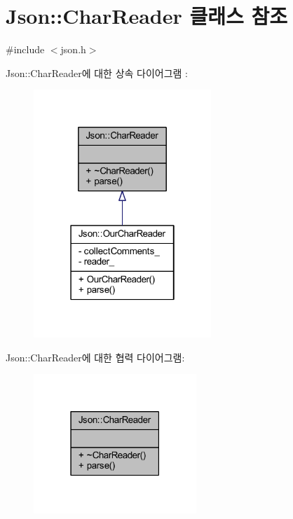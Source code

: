 \hypertarget{class_json_1_1_char_reader}{}\section{Json\+:\+:Char\+Reader 클래스 참조}
\label{class_json_1_1_char_reader}


{\ttfamily \#include $<$json.\+h$>$}



Json\+:\+:Char\+Reader에 대한 상속 다이어그램 \+: \nopagebreak
\begin{figure}[H]
\begin{center}
\leavevmode
\includegraphics[width=190pt]{class_json_1_1_char_reader__inherit__graph}
\end{center}
\end{figure}


Json\+:\+:Char\+Reader에 대한 협력 다이어그램\+:\nopagebreak
\begin{figure}[H]
\begin{center}
\leavevmode
\includegraphics[width=174pt]{class_json_1_1_char_reader__coll__graph}
\end{center}
\end{figure}
